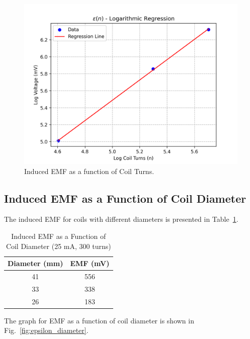 \documentclass[journal]{IEEEtran}
\begin{document}
\begin{figure}[H]
    \centering
    \includegraphics[width=0.9\linewidth]{output_plots/epsilonN.png}
    \caption{Induced EMF as a function of Coil Turns.}
    \label{fig:epsilon_turns}
\end{figure}

\subsection{Induced EMF as a Function of Coil Diameter}
The induced EMF for coils with different diameters is presented in Table~\ref{tab:emf_diameter}.

\begin{table}[H]
    \centering
    \caption{Induced EMF as a Function of Coil Diameter (25 mA, 300 turns)}
    \begin{tabular}{cc}
        \hline
        Diameter (mm) & EMF (mV) \\ \hline
        41 & 556 \\
        33 & 338 \\
        26 & 183 \\ \hline
    \end{tabular}
    \label{tab:emf_diameter}
\end{table}

The graph for EMF as a function of coil diameter is shown in Fig.~\ref{fig:epsilon_diameter}.
\end{document}
